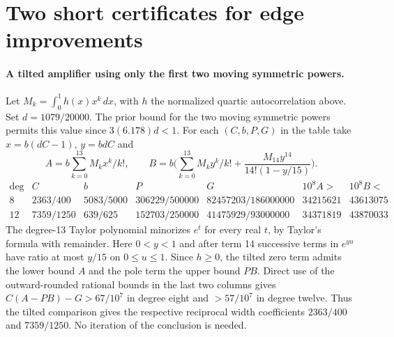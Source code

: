 \documentclass[11pt]{article}
\begin{document}
\section{Two short certificates for edge improvements}\label{sec:tabtilt}


\paragraph{A tilted amplifier using only the first two moving symmetric powers.}
Let $M_k=\int_0^1h(x)x^k\,dx$, with $h$ the normalized quartic autocorrelation above. Set $d=1079/20000$. The prior bound for the two moving symmetric powers permits this value since $3(6.178)d<1$. For each $(C,b,P,G)$ in the table take $x=b(dC-1)$, $y=bdC$ and
\[
 A=b\sum_{k=0}^{13}M_kx^k/k!,\qquad B=b\biggl(\sum_{k=0}^{13}M_ky^k/k!+
 \frac{M_{14}y^{14}}{14!(1-y/15)}\biggr).
\]
{\small\setlength{\arraycolsep}{3pt}\[
\begin{array}{c|rrrr|cc}
\deg & C & b & P & G & 10^8 A> &10^8B< \\ \hline
8 &2363/400&5083/5000&306229/500000&82457203/186000000&34215621&43613075\\
12&7359/1250&639/625&152703/250000&41475929/93000000&34371819&43870033
\end{array}
\]}
The degree-13 Taylor polynomial minorizes $e^t$ for every real $t$, by Taylor's formula with remainder. Here $0<y<1$ and after term 14 successive terms in $e^{yu}$ have ratio at most $y/15$ on $0\le u\le1$. Since $h\ge0$, the tilted zero term admits the lower bound $A$ and the pole term the upper bound $PB$. Direct use of the outward-rounded rational bounds in the last two columns gives $C(A-PB)-G>67/10^7$ in degree eight and $>57/10^7$ in degree twelve. Thus the tilted comparison gives the respective reciprocal width coefficients $2363/400$ and $7359/1250$. No iteration of the conclusion is needed.
\end{document}
